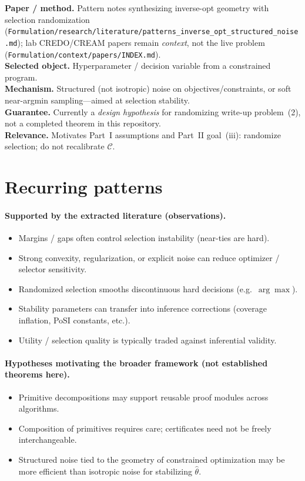 \documentclass[11pt]{article}
\begin{document}
\begin{tcolorbox}[entrybox, title=Optimization robustness / structured selection noise]
\textbf{Paper / method.} Pattern notes synthesizing inverse-opt geometry with selection
randomization
(\texttt{Formulation/research/literature/patterns\_inverse\_opt\_structured\_noise.md});
lab CREDO/CREAM papers remain \emph{context}, not the live problem
(\texttt{Formulation/context/papers/INDEX.md}).\\
\textbf{Selected object.} Hyperparameter / decision variable from a constrained program.\\
\textbf{Mechanism.} Structured (not isotropic) noise on objectives/constraints, or soft
near-argmin sampling---aimed at selection stability.\\
\textbf{Guarantee.} Currently a \emph{design hypothesis} for randomizing write-up
problem~(2), not a completed theorem in this repository.\\
\textbf{Relevance.} Motivates Part~I assumptions and Part~II goal~(iii): randomize
selection; do not recalibrate $\mathcal{C}$.
\end{tcolorbox}

\section{Recurring patterns}

\paragraph{Supported by the extracted literature (observations).}
\begin{itemize}
  \item Margins / gaps often control selection instability (near-ties are hard).
  \item Strong convexity, regularization, or explicit noise can reduce optimizer /
        selector sensitivity.
  \item Randomized selection smooths discontinuous hard decisions (e.g.\ $\arg\max$).
  \item Stability parameters can transfer into inference corrections (coverage inflation,
        PoSI constants, etc.).
  \item Utility / selection quality is typically traded against inferential validity.
\end{itemize}

\paragraph{Hypotheses motivating the broader framework (not established theorems here).}
\begin{itemize}
  \item Primitive decompositions may support reusable proof modules across algorithms.
  \item Composition of primitives requires care; certificates need not be freely
        interchangeable.
  \item Structured noise tied to the geometry of constrained optimization may be more
        efficient than isotropic noise for stabilizing $\hat\theta$.
\end{itemize}
\end{document}
